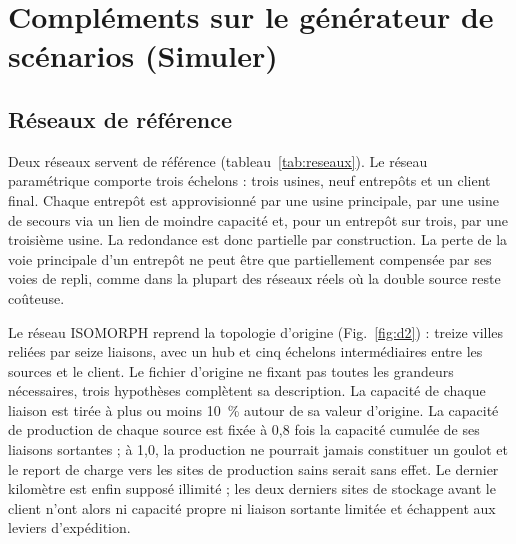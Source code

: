 \section{Compléments sur le générateur de scénarios (Simuler)}
\label{sec:S3}

\subsection{Réseaux de référence}
\label{sec:S3.1}

Deux réseaux servent de référence (tableau~\ref{tab:reseaux}). Le réseau paramétrique comporte trois échelons : trois usines, neuf entrepôts et un client final. Chaque entrepôt est approvisionné par une usine principale, par une usine de secours via un lien de moindre capacité et, pour un entrepôt sur trois, par une troisième usine. La redondance est donc partielle par construction. La perte de la voie principale d'un entrepôt ne peut être que partiellement compensée par ses voies de repli, comme dans la plupart des réseaux réels où la double source reste coûteuse.

Le réseau ISOMORPH reprend la topologie d'origine (Fig.~\ref{fig:d2}) : treize villes reliées par seize liaisons, avec un hub et cinq échelons intermédiaires entre les sources et le client. Le fichier d'origine ne fixant pas toutes les grandeurs nécessaires, trois hypothèses complètent sa description. La capacité de chaque liaison est tirée à plus ou moins 10~\% autour de sa valeur d'origine. La capacité de production de chaque source est fixée à 0,8 fois la capacité cumulée de ses liaisons sortantes ; à 1,0, la production ne pourrait jamais constituer un goulot et le report de charge vers les sites de production sains serait sans effet. Le dernier kilomètre est enfin supposé illimité ; les deux derniers sites de stockage avant le client n'ont alors ni capacité propre ni liaison sortante limitée et échappent aux leviers d'expédition.

\begin{center}

\label{fig:d2}
\end{center}

